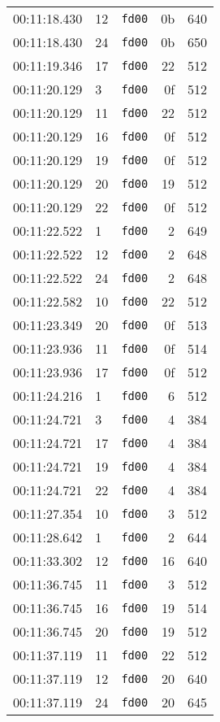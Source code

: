 \documentclass{article}
\begin{document}
\begin{longtable}{lllrr}
00:11:18.430 & 12 & \texttt{fd00} & 0b & 640 \\
00:11:18.430 & 24 & \texttt{fd00} & 0b & 650 \\
00:11:19.346 & 17 & \texttt{fd00} & 22 & 512 \\
00:11:20.129 & 3 & \texttt{fd00} & 0f & 512 \\
00:11:20.129 & 11 & \texttt{fd00} & 22 & 512 \\
00:11:20.129 & 16 & \texttt{fd00} & 0f & 512 \\
00:11:20.129 & 19 & \texttt{fd00} & 0f & 512 \\
00:11:20.129 & 20 & \texttt{fd00} & 19 & 512 \\
00:11:20.129 & 22 & \texttt{fd00} & 0f & 512 \\
00:11:22.522 & 1 & \texttt{fd00} & 2 & 649 \\
00:11:22.522 & 12 & \texttt{fd00} & 2 & 648 \\
00:11:22.522 & 24 & \texttt{fd00} & 2 & 648 \\
00:11:22.582 & 10 & \texttt{fd00} & 22 & 512 \\
00:11:23.349 & 20 & \texttt{fd00} & 0f & 513 \\
00:11:23.936 & 11 & \texttt{fd00} & 0f & 514 \\
00:11:23.936 & 17 & \texttt{fd00} & 0f & 512 \\
00:11:24.216 & 1 & \texttt{fd00} & 6 & 512 \\
00:11:24.721 & 3 & \texttt{fd00} & 4 & 384 \\
00:11:24.721 & 17 & \texttt{fd00} & 4 & 384 \\
00:11:24.721 & 19 & \texttt{fd00} & 4 & 384 \\
00:11:24.721 & 22 & \texttt{fd00} & 4 & 384 \\
00:11:27.354 & 10 & \texttt{fd00} & 3 & 512 \\
00:11:28.642 & 1 & \texttt{fd00} & 2 & 644 \\
00:11:33.302 & 12 & \texttt{fd00} & 16 & 640 \\
00:11:36.745 & 11 & \texttt{fd00} & 3 & 512 \\
00:11:36.745 & 16 & \texttt{fd00} & 19 & 514 \\
00:11:36.745 & 20 & \texttt{fd00} & 19 & 512 \\
00:11:37.119 & 11 & \texttt{fd00} & 22 & 512 \\
00:11:37.119 & 12 & \texttt{fd00} & 20 & 640 \\
00:11:37.119 & 24 & \texttt{fd00} & 20 & 645 \\

\end{longtable}
\end{document}
